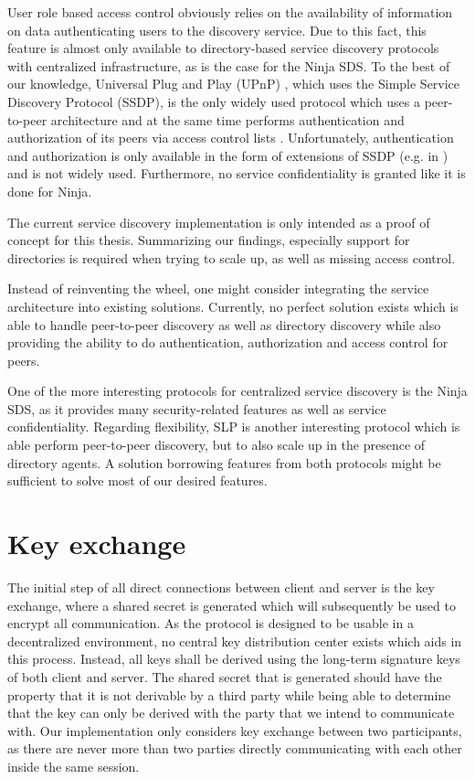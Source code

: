 User role based access control obviously relies on the availability of information on data authenticating users to the discovery service.
Due to this fact, this feature is almost only available to directory-based service discovery protocols with centralized infrastructure, as is the case for the Ninja SDS.
To the best of our knowledge, Universal Plug and Play (UPnP) \cite{miller2001home}, which uses the Simple Service Discovery Protocol (SSDP), is the only widely used protocol which uses a peer-to-peer architecture and at the same time performs authentication and authorization of its peers via access control lists \cite{zhu2005service,edwards2006discovery}.
Unfortunately, authentication and authorization is only available in the form of extensions of SSDP (e.g.  in \cite{ellison2003device}) and is not widely used.
Furthermore, no service confidentiality is granted like it is done for Ninja.

\bigskip

The current service discovery implementation is only intended as a proof of concept for this thesis.
Summarizing our findings, especially support for directories is required when trying to scale up, as well as missing access control.

Instead of reinventing the wheel, one might consider integrating the service architecture into existing solutions.
Currently, no perfect solution exists which is able to handle peer-to-peer discovery as well as directory discovery while also providing the ability to do authentication, authorization and access control for peers.

One of the more interesting protocols for centralized service discovery is the Ninja SDS, as it provides many security-related features as well as service confidentiality.
Regarding flexibility, SLP is another interesting protocol which is able perform peer-to-peer discovery, but to also scale up in the presence of directory agents.
A solution borrowing features from both protocols might be sufficient to solve most of our desired features.

\section{Key exchange}
\label{sec:key-exchange}

The initial step of all direct connections between client and server is the key exchange, where a shared secret is generated which will subsequently be used to encrypt all communication.
As the protocol is designed to be usable in a decentralized environment, no central key distribution center exists which aids in this process.
Instead, all keys shall be derived using the long-term signature keys of both client and server.
The shared secret that is generated should have the property that it is not derivable by a third party while being able to determine that the key can only be derived with the party that we intend to communicate with.
Our implementation only considers key exchange between two participants, as there are never more than two parties directly communicating with each other inside the same session.

